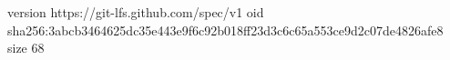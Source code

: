 version https://git-lfs.github.com/spec/v1
oid sha256:3abcb3464625dc35e443e9f6c92b018ff23d3c6c65a553ce9d2c07de4826afe8
size 68
